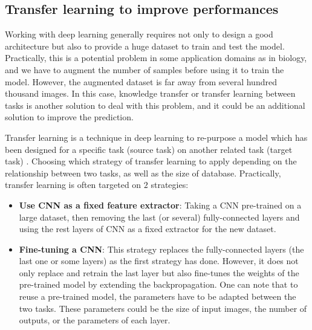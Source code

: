 \documentclass[review]{elsarticle}
\begin{document}
\subsection{Transfer learning to improve performances}
Working with deep learning generally requires not only to design a good architecture but also to provide a huge dataset to train and test the model. Practically, this is a potential problem in some application domains as in biology, and we have to augment the number of samples before using it to train the model. However, the augmented dataset is far away from several hundred thousand images. In this case, knowledge transfer or transfer learning between tasks is another solution to deal with this problem, and it could be an additional solution to improve the prediction.

Transfer learning is a technique in deep learning to re-purpose a model which has been designed for a specific task (source task) on another related task (target task) \cite{olivas2009handbook, yosinski2014transferable}. Choosing which strategy of transfer learning to apply depending on the relationship between two tasks, as well as the size of database. Practically, transfer learning is often targeted on $2$ strategies:
\begin{itemize}
	\item \textbf{Use CNN as a fixed feature extractor}: Taking a CNN pre-trained on a large dataset, then removing the last (or several) fully-connected layers and using the rest layers of CNN as a fixed extractor for the new dataset.
	\item \textbf{Fine-tuning a CNN}: This strategy replaces the fully-connected layers (the last one or some layers) as the first strategy has done. However, it does not only replace and retrain the last layer but also fine-tunes the weights of the pre-trained model by extending the backpropagation. One can note that to reuse a pre-trained model, the parameters have to be adapted between the two tasks. These parameters could be the size of input images, the number of outputs, or the parameters of each layer.
\end{itemize}
\end{document}
